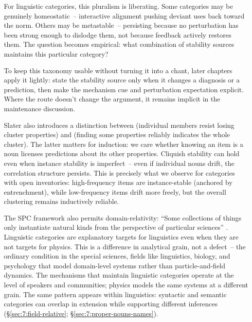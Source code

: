For linguistic categories, this pluralism is liberating. Some categories may be genuinely homeostatic~-- interactive alignment pushing deviant uses back toward the norm. Others may be metastable~-- persisting because no perturbation has been strong enough to dislodge them, not because feedback actively restores them. The question becomes empirical: what combination of stability sources maintains this particular category?

To keep this taxonomy usable without turning it into a chant, later chapters apply it lightly: state the stability source only when it changes a diagnosis or a prediction, then make the mechanism cue and perturbation expectation explicit. Where the route doesn't change the argument, it remains implicit in the maintenance discussion.

Slater also introduces a distinction between  (individual members resist losing cluster properties) and  (finding some properties reliably indicates the whole cluster). The latter matters for induction: we care whether knowing an item is a noun licenses predictions about its other properties. Cliquish stability can hold even when instance stability is imperfect~-- even if individual nouns drift, the correlation structure persists. This is precisely what we observe for categories with open inventories: high-frequency items are instance-stable (anchored by entrenchment), while low-frequency items drift more freely, but the overall clustering remains inductively reliable.

The SPC framework also permits domain-relativity: \enquote{Some collections of things only instantiate natural kinds from the perspective of particular sciences} \citep[392]{slater2015}. Linguistic categories are explanatory targets for linguistics even when they are not targets for physics. This is a difference in analytical grain, not a defect~-- the ordinary condition in the special sciences, fields like linguistics, biology, and psychology that model domain-level systems rather than particle-and-field dynamics. The mechanisms that maintain linguistic categories operate at the level of speakers and communities; physics models the same systems at a different grain. The same pattern appears within linguistics: syntactic and semantic categories can overlap in extension while supporting different inferences (§\ref{sec:7:field-relative}; §\ref{sec:7:proper-nouns-names}).


